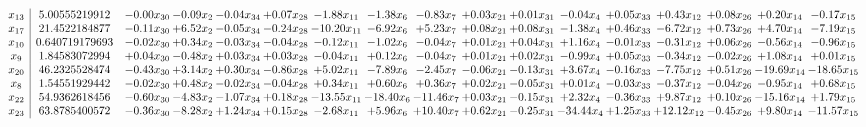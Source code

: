 \documentclass[9pt]{article}
\begin{document}
 \[\begin{array}{c| c c@{\hskip 2pt} c@{\hskip 2pt} c@{\hskip 2pt} c@{\hskip 2pt} c@{\hskip 2pt} c@{\hskip 2pt} c@{\hskip 2pt} c@{\hskip 2pt} c@{\hskip 2pt} c@{\hskip 2pt} c@{\hskip 2pt} c@{\hskip 2pt} c@{\hskip 2pt} c@{\hskip 2pt} c@{\hskip 2pt} }
 x_{13}   &  5.00555219912 & -0.00 x_{30} & -0.09 x_{2} & -0.04 x_{34} & +  0.07 x_{28} & -1.88 x_{11} & -1.38 x_{6} & -0.83 x_{7} & +  0.03 x_{21} & +  0.01 x_{31} & -0.04 x_{4} & +  0.05 x_{33} & +  0.43 x_{12} & +  0.08 x_{26} & +  0.20 x_{14} & -0.17 x_{15}\\
 x_{17}   &  21.4522184877 & -0.11 x_{30} & +  6.52 x_{2} & -0.05 x_{34} & -0.24 x_{28} & -10.20 x_{11} & -6.92 x_{6} & +  5.23 x_{7} & +  0.08 x_{21} & +  0.08 x_{31} & -1.38 x_{4} & +  0.46 x_{33} & -6.72 x_{12} & +  0.73 x_{26} & +  4.70 x_{14} & -7.19 x_{15}\\
 x_{10}   &  0.640719179693 & -0.02 x_{30} & +  0.34 x_{2} & -0.03 x_{34} & -0.04 x_{28} & -0.12 x_{11} & -1.02 x_{6} & -0.04 x_{7} & +  0.01 x_{21} & +  0.04 x_{31} & +  1.16 x_{4} & -0.01 x_{33} & -0.31 x_{12} & +  0.06 x_{26} & -0.56 x_{14} & -0.96 x_{15}\\
 x_{9}   &  1.84583072994 & +  0.04 x_{30} & -0.48 x_{2} & +  0.03 x_{34} & +  0.03 x_{28} & -0.04 x_{11} & +  0.12 x_{6} & -0.04 x_{7} & +  0.01 x_{21} & +  0.02 x_{31} & -0.99 x_{4} & +  0.05 x_{33} & -0.34 x_{12} & -0.02 x_{26} & +  1.08 x_{14} & +  0.01 x_{15}\\
 x_{20}   &  46.2325528474 & -0.43 x_{30} & +  3.14 x_{2} & +  0.30 x_{34} & -0.86 x_{28} & +  5.02 x_{11} & -7.89 x_{6} & -2.45 x_{7} & -0.06 x_{21} & -0.13 x_{31} & +  3.67 x_{4} & -0.16 x_{33} & -7.75 x_{12} & +  0.51 x_{26} & -19.69 x_{14} & -18.65 x_{15}\\
 x_{8}   &  1.54551929442 & -0.02 x_{30} & +  0.48 x_{2} & -0.02 x_{34} & -0.04 x_{28} & +  0.34 x_{11} & +  0.60 x_{6} & +  0.36 x_{7} & +  0.02 x_{21} & -0.05 x_{31} & +  0.01 x_{4} & -0.03 x_{33} & -0.37 x_{12} & -0.04 x_{26} & -0.95 x_{14} & +  0.68 x_{15}\\
 x_{22}   &  54.9362618456 & -0.60 x_{30} & -4.83 x_{2} & -1.07 x_{34} & +  0.18 x_{28} & -13.55 x_{11} & -18.40 x_{6} & -11.46 x_{7} & +  0.03 x_{21} & -0.15 x_{31} & +  2.32 x_{4} & -0.36 x_{33} & +  9.87 x_{12} & +  0.10 x_{26} & -15.16 x_{14} & +  1.79 x_{15}\\
 x_{23}   &  63.8785400572 & -0.36 x_{30} & -8.28 x_{2} & +  1.24 x_{34} & +  0.15 x_{28} & -2.68 x_{11} & +  5.96 x_{6} & + 10.40 x_{7} & +  0.62 x_{21} & -0.25 x_{31} & -34.44 x_{4} & +  1.25 x_{33} & + 12.12 x_{12} & -0.45 x_{26} & +  9.80 x_{14} & -11.57 x_{15}\\

\end{array}\]
\end{document}
